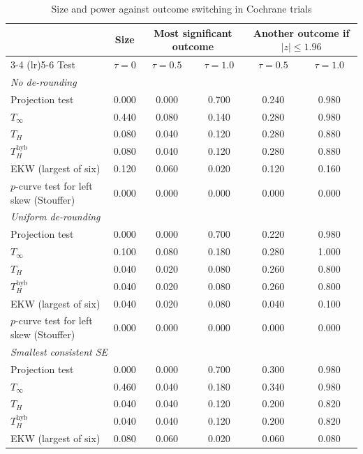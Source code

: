 \begin{table}[htbp]
\centering
\caption{Size and power against outcome switching in Cochrane trials}
\label{tab:cochrane_switching_power_desktop_main}
\footnotesize
\setlength{\tabcolsep}{4pt}
\begin{tabular}{lccccc}
\toprule
 & Size & \multicolumn{2}{c}{Most significant outcome} & \multicolumn{2}{c}{Another outcome if $|z| \le 1.96$} \\
\cmidrule(lr){3-4} \cmidrule(lr){5-6}
Test & $\tau = 0$ & $\tau = 0.5$ & $\tau = 1.0$ & $\tau = 0.5$ & $\tau = 1.0$ \\
\midrule
\multicolumn{6}{l}{\textit{No de-rounding}} \\
Projection test & 0.000 & 0.000 & 0.700 & 0.240 & 0.980 \\
$T_\infty$ & 0.440 & 0.080 & 0.140 & 0.280 & 0.980 \\
$T_H$ & 0.080 & 0.040 & 0.120 & 0.280 & 0.880 \\
$T_H^{\mathrm{hyb}}$ & 0.080 & 0.040 & 0.120 & 0.280 & 0.880 \\
EKW (largest of six) & 0.120 & 0.060 & 0.020 & 0.120 & 0.160 \\
$p$-curve test for left skew (Stouffer) & 0.000 & 0.000 & 0.000 & 0.000 & 0.000 \\
\midrule
\multicolumn{6}{l}{\textit{Uniform de-rounding}} \\
Projection test & 0.000 & 0.000 & 0.700 & 0.220 & 0.980 \\
$T_\infty$ & 0.100 & 0.080 & 0.180 & 0.280 & 1.000 \\
$T_H$ & 0.040 & 0.020 & 0.080 & 0.260 & 0.800 \\
$T_H^{\mathrm{hyb}}$ & 0.040 & 0.020 & 0.080 & 0.260 & 0.800 \\
EKW (largest of six) & 0.040 & 0.020 & 0.080 & 0.040 & 0.100 \\
$p$-curve test for left skew (Stouffer) & 0.000 & 0.000 & 0.000 & 0.000 & 0.000 \\
\midrule
\multicolumn{6}{l}{\textit{Smallest consistent SE}} \\
Projection test & 0.000 & 0.000 & 0.700 & 0.300 & 0.980 \\
$T_\infty$ & 0.460 & 0.040 & 0.180 & 0.340 & 0.980 \\
$T_H$ & 0.040 & 0.040 & 0.120 & 0.200 & 0.820 \\
$T_H^{\mathrm{hyb}}$ & 0.040 & 0.040 & 0.120 & 0.200 & 0.820 \\
EKW (largest of six) & 0.080 & 0.060 & 0.020 & 0.060 & 0.080 \\

\end{tabular}
\end{table}
